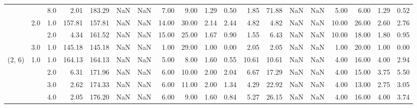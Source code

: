 \begin{tabular}{lllrrrrrrrrrrrrrrrr}
       &     & 8.0  &      2.01 &     183.29 &               NaN &                NaN &  7.00 &   9.00 &             1.29 &                         0.50 &      1.85 &      71.88 &               NaN &                NaN &  5.00 &   6.00 &             1.29 &                         0.52 \\
       & 2.0 & 1.0  &    157.81 &     157.81 &               NaN &                NaN & 14.00 &  30.00 &             2.14 &                         2.44 &      4.82 &       4.82 &               NaN &                NaN & 10.00 &  26.00 &             2.60 &                         2.76 \\
       &     & 2.0  &      4.34 &     161.52 &               NaN &                NaN & 15.00 &  25.00 &             1.67 &                         0.90 &      1.55 &       6.43 &               NaN &                NaN & 10.00 &  18.00 &             1.80 &                         0.95 \\
       & 3.0 & 1.0  &    145.18 &     145.18 &               NaN &                NaN &  1.00 &  29.00 &             1.00 &                         0.00 &      2.05 &       2.05 &               NaN &                NaN &  1.00 &  20.00 &             1.00 &                         0.00 \\
(2, 6) & 1.0 & 1.0  &    164.13 &     164.13 &               NaN &                NaN &  5.00 &   8.00 &             1.60 &                         0.55 &     10.61 &      10.61 &               NaN &                NaN &  4.00 &  16.00 &             4.00 &                         2.94 \\
       &     & 2.0  &      6.31 &     171.96 &               NaN &                NaN &  6.00 &  10.00 &             2.00 &                         2.04 &      6.67 &      17.29 &               NaN &                NaN &  4.00 &  15.00 &             3.75 &                         5.50 \\
       &     & 3.0  &      2.62 &     174.33 &               NaN &                NaN &  6.00 &  11.00 &             2.00 &                         1.34 &      4.29 &      22.92 &               NaN &                NaN &  4.00 &  13.00 &             2.75 &                         3.05 \\
       &     & 4.0  &      2.05 &     176.20 &               NaN &                NaN &  6.00 &   9.00 &             1.60 &                         0.84 &      5.27 &      26.15 &               NaN &                NaN &  4.00 &  16.00 &             4.00 &                         3.74 \\

\end{tabular}
